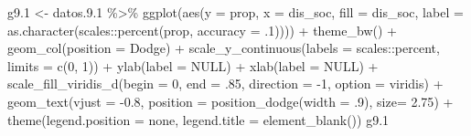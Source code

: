 \documentclass[
  12pt,
]{book}
\newenvironment{Shaded}{\begin{snugshade}}{\end{snugshade}}
\newcommand{\AttributeTok}[1]{\textcolor[rgb]{0.77,0.63,0.00}{#1}}
\newcommand{\ConstantTok}[1]{\textcolor[rgb]{0.00,0.00,0.00}{#1}}
\newcommand{\DecValTok}[1]{\textcolor[rgb]{0.00,0.00,0.81}{#1}}
\newcommand{\FloatTok}[1]{\textcolor[rgb]{0.00,0.00,0.81}{#1}}
\newcommand{\FunctionTok}[1]{\textcolor[rgb]{0.00,0.00,0.00}{#1}}
\newcommand{\NormalTok}[1]{#1}
\newcommand{\OtherTok}[1]{\textcolor[rgb]{0.56,0.35,0.01}{#1}}
\newcommand{\SpecialCharTok}[1]{\textcolor[rgb]{0.00,0.00,0.00}{#1}}
\newcommand{\StringTok}[1]{\textcolor[rgb]{0.31,0.60,0.02}{#1}}
\begin{document}
\begin{Shaded}
\begin{Highlighting}[]
\NormalTok{g9}\FloatTok{.1} \OtherTok{\textless{}{-}}\NormalTok{ datos.}\FloatTok{9.1} \SpecialCharTok{\%\textgreater{}\%} 
  \FunctionTok{ggplot}\NormalTok{(}\FunctionTok{aes}\NormalTok{(}\AttributeTok{y =}\NormalTok{ prop, }\AttributeTok{x =}\NormalTok{ dis\_soc, }\AttributeTok{fill =}\NormalTok{ dis\_soc, }
             \AttributeTok{label =} \FunctionTok{as.character}\NormalTok{(scales}\SpecialCharTok{::}\FunctionTok{percent}\NormalTok{(prop, }\AttributeTok{accuracy =}\NormalTok{ .}\DecValTok{1}\NormalTok{)))) }\SpecialCharTok{+}
  \FunctionTok{theme\_bw}\NormalTok{() }\SpecialCharTok{+} 
  \FunctionTok{geom\_col}\NormalTok{(}\AttributeTok{position =} \StringTok{\textquotesingle{}Dodge\textquotesingle{}}\NormalTok{) }\SpecialCharTok{+}
  \FunctionTok{scale\_y\_continuous}\NormalTok{(}\AttributeTok{labels =}\NormalTok{ scales}\SpecialCharTok{::}\NormalTok{percent,}
                      \AttributeTok{limits =} \FunctionTok{c}\NormalTok{(}\DecValTok{0}\NormalTok{, }\DecValTok{1}\NormalTok{)) }\SpecialCharTok{+}
  \FunctionTok{ylab}\NormalTok{(}\AttributeTok{label =} \ConstantTok{NULL}\NormalTok{) }\SpecialCharTok{+}
  \FunctionTok{xlab}\NormalTok{(}\AttributeTok{label =} \ConstantTok{NULL}\NormalTok{) }\SpecialCharTok{+}
  \FunctionTok{scale\_fill\_viridis\_d}\NormalTok{(}\AttributeTok{begin =} \DecValTok{0}\NormalTok{, }\AttributeTok{end =}\NormalTok{ .}\DecValTok{85}\NormalTok{, }\AttributeTok{direction =} \SpecialCharTok{{-}}\DecValTok{1}\NormalTok{, }\AttributeTok{option =} \StringTok{\textquotesingle{}viridis\textquotesingle{}}\NormalTok{) }\SpecialCharTok{+}
  \FunctionTok{geom\_text}\NormalTok{(}\AttributeTok{vjust =} \SpecialCharTok{{-}}\FloatTok{0.8}\NormalTok{,}
            \AttributeTok{position =} \FunctionTok{position\_dodge}\NormalTok{(}\AttributeTok{width =}\NormalTok{ .}\DecValTok{9}\NormalTok{),}
            \AttributeTok{size=} \FloatTok{2.75}\NormalTok{) }\SpecialCharTok{+}
  \FunctionTok{theme}\NormalTok{(}\AttributeTok{legend.position =} \StringTok{\textquotesingle{}none\textquotesingle{}}\NormalTok{, }
        \AttributeTok{legend.title =} \FunctionTok{element\_blank}\NormalTok{())}
\NormalTok{g9}\FloatTok{.1}
\end{Highlighting}
\end{Shaded}
\end{document}
